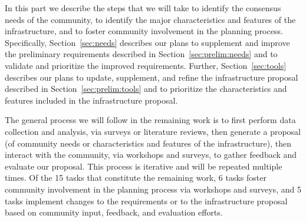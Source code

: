 
\vspace*{-4.5pt}
In this part we describe
the steps that we will take
to identify the consensus needs of the community,
to identify the major characteristics and features of the infrastructure, and
to foster community involvement in the planning process.
Specifically, Section~\ref{sec:needs} describes our plans
to supplement and improve the preliminary requirements
described in Section~\ref{sec:prelim:needs}
and to validate and prioritize the improved requirements. 
Further, Section~\ref{sec:tools} describes our plans
to update, supplement, and refine the infrastructure proposal described in Section~\ref{sec:prelim:tools}
and to prioritize the characteristics and features included in the infrastructure proposal. 

The general process we will follow in the remaining work is to first perform data collection and analysis, via surveys or literature reviews, then generate a proposal (of community needs or characteristics and features of the infrastructure), then interact with the community, via workshops and surveys, to gather feedback and evaluate our proposal. This process is iterative and will be repeated multiple times. Of the 15 tasks that constitute the remaining work,
6 tasks foster community involvement in the planning process via workshops and surveys, and
5 tasks implement changes to the requirements or to the infrastructure proposal
based on community input, feedback, and evaluation efforts.



